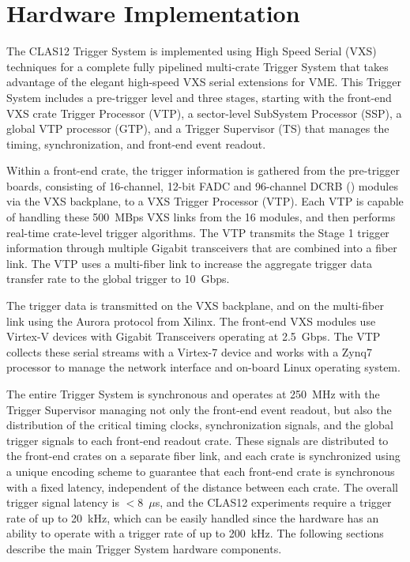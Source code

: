 \section{Hardware Implementation}

The CLAS12 Trigger System is implemented using High Speed Serial (VXS) techniques for a complete fully pipelined multi-crate Trigger System that takes advantage of the elegant high-speed VXS serial extensions for VME.  This Trigger System includes a pre-trigger level and three stages, starting with the front-end VXS crate Trigger Processor (VTP), a sector-level SubSystem Processor (SSP), a global VTP processor (GTP), and a Trigger Supervisor (TS) that manages the timing, synchronization, and front-end event readout.

Within a front-end crate, the trigger information is gathered from the pre-trigger boards, consisting of 16-channel, 12-bit FADC and 96-channel DCRB (\cite{daq-ref}) modules via the VXS backplane, to a VXS Trigger Processor (VTP). Each VTP is capable of handling these 500~MBps VXS links from the 16 modules, and then performs real-time crate-level trigger algorithms.  The VTP transmits the Stage 1 trigger information through multiple Gigabit transceivers that are combined into a fiber link. The VTP uses a multi-fiber link to increase the aggregate trigger data transfer rate to the global trigger to 10~Gbps.

The trigger data is transmitted on the VXS backplane, and on the multi-fiber link using the Aurora protocol from Xilinx.  The front-end VXS modules use Virtex-V devices with Gigabit Transceivers operating at 2.5~Gbps. The VTP collects these serial streams with a Virtex-7 device and works with a Zynq7 processor to manage the network interface and on-board Linux operating system.

The entire Trigger System is synchronous and operates at 250~MHz with the Trigger Supervisor managing not only the front-end event readout, but also the distribution of the critical timing clocks, synchronization signals, and the global trigger signals to each front-end readout crate.  These signals are distributed to the front-end crates on a separate fiber link, and each crate is synchronized using a unique encoding scheme to guarantee that each front-end crate is synchronous with a fixed latency, independent of the distance between each crate.  The overall trigger signal latency is $<$8~$\mu$s, and the CLAS12 experiments require a trigger rate of up to 20~kHz, which can be easily handled since the hardware has an ability to operate with a trigger rate of up to 200~kHz. The following sections describe the main Trigger System hardware components.


